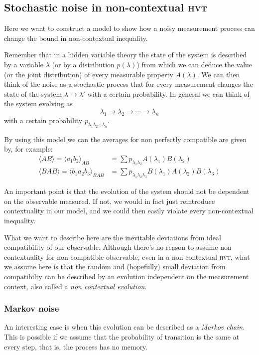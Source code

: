 \documentclass[a4paper]{article}
\newcommand{\acron}[1]{\textsc{#1}}
\newcommand{\HVT}{\acron{hvt}}
\theoremstyle{definition}
\begin{document}
\subsection{Stochastic noise in non-contextual \HVT{}}
Here we want to construct a model to show how a noisy measurement process can
change the bound in non-contextual inequality.

Remember that in a hidden variable theory the state of the system is described
by a variable $\lambda$ (or by a distribution $p(\lambda)$) from which we can
deduce the value (or the joint distribution) of every measurable property $A(\lambda)$.
We can then think of the noise as a stochastic process that for every
measurement changes the state of the system $\lambda \rightarrow \lambda'$ with a certain
probability.
In general we can think of the system evolving as
\begin{equation}
    \lambda_1 \rightarrow\lambda_2 \rightarrow\cdots\rightarrow\lambda_n
    \label{eq:noiseHV_evolution}
\end{equation}
with a certain probability $p_{\lambda_1\lambda_2\ldots\lambda_n}$.

By using this model we can the averages for non perfectly compatible are given
by, for example:
\begin{align}
    \langle{AB}\rangle = \langle{a_1b_2}\rangle_{AB} &= \sum
    p_{\lambda_1\lambda_2}A(\lambda_1)B(\lambda_2)\\
    \langle{BAB}\rangle = \langle{b_1a_2b_3}\rangle_{BAB} &= \sum
    p_{\lambda_1\lambda_2\lambda_3}B(\lambda_1)A(\lambda_2)B(\lambda_3)
    \label{eq:noiseHV_avg}
\end{align}

An important point is that the evolution of the system should not be dependent
on the observable measured.
If not, we would in fact just reintroduce contextuality in our model, and we
could then easily violate every non-contextual inequality.

What we want to describe here are the inevitable deviations from ideal
compatibility of our observable. 
Although there's no reason to assume non contextuality for non compatible
observable, even in a non contextual \HVT{}, what we assume here is that the
random and (hopefully) small deviation from compatibilty can be described by an
evolution independent on the measurement context, also called a \emph{non contextual
evolution}. 

\subsubsection{Markov noise}
An interesting case is when this evolution can be described as a \emph{Markov
chain}.
This is possible if we assume that the probability of transition is the same at
every step, that is, the process has no memory.
\end{document}
